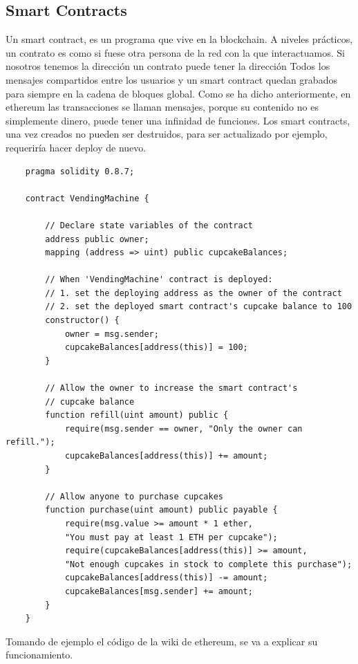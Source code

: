 \subsection{Smart Contracts}
Un smart contract, es un programa que vive en la blockchain. A niveles prácticos, un contrato es como si fuese otra persona de la red con la que interactuamos.
Si nosotros tenemos la dirección
un contrato puede tener la dirección
Todos los mensajes compartidos entre los usuarios y un smart contract quedan grabados para siempre en la cadena de bloques global. Como se ha dicho anteriormente, en ethereum las transacciones se llaman mensajes, porque su contenido no es simplemente dinero, puede tener una infinidad de funciones.
Los smart contracts, una vez creados no pueden ser destruidos, para ser actualizado por ejemplo, requeriría hacer deploy de nuevo.
\begin{lstlisting}
    pragma solidity 0.8.7;

    contract VendingMachine {
    
        // Declare state variables of the contract
        address public owner;
        mapping (address => uint) public cupcakeBalances;
    
        // When 'VendingMachine' contract is deployed:
        // 1. set the deploying address as the owner of the contract
        // 2. set the deployed smart contract's cupcake balance to 100
        constructor() {
            owner = msg.sender;
            cupcakeBalances[address(this)] = 100;
        }
    
        // Allow the owner to increase the smart contract's 
        // cupcake balance
        function refill(uint amount) public {
            require(msg.sender == owner, "Only the owner can refill.");
            cupcakeBalances[address(this)] += amount;
        }
    
        // Allow anyone to purchase cupcakes
        function purchase(uint amount) public payable {
            require(msg.value >= amount * 1 ether, 
            "You must pay at least 1 ETH per cupcake");
            require(cupcakeBalances[address(this)] >= amount,
            "Not enough cupcakes in stock to complete this purchase");
            cupcakeBalances[address(this)] -= amount;
            cupcakeBalances[msg.sender] += amount;
        }
    }
\end{lstlisting}
Tomando de ejemplo el código de la wiki de ethereum, se va a explicar su funcionamiento. \cite{web:sample_smart_contract}
